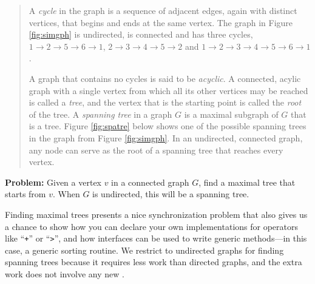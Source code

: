 \begin{quote}
A {\em cycle} in the graph is a sequence of adjacent edges, again with distinct
vertices, that begins and ends at the same vertex.
The graph in Figure \ref{fig:simgph} is undirected, is connected and has three
cycles, 
$1 \rightarrow 2 \rightarrow 5 \rightarrow 6 \rightarrow 1$,
$2 \rightarrow 3 \rightarrow 4 \rightarrow 5 \rightarrow 2$ and
$1 \rightarrow 2 \rightarrow 3 \rightarrow 4 \rightarrow 5 \rightarrow 6 \rightarrow 1$.

A graph that contains no cycles is said to be {\em acyclic}.  A connected,
acylic graph with a single vertex from which all its other vertices may be
reached is called a {\em tree}, and the vertex that is the starting point is
called the {\em root} of the tree. A {\em spanning tree} in a graph $G$ is a
maximal subgraph of $G$ that is a tree. Figure \ref{fig:spatre} below shows one
of the possible spanning trees in the graph from Figure \ref{fig:simgph}.
In an undirected, connected graph, any node can serve as the root of a
spanning tree that reaches every vertex.
\end{quote}

{\bf Problem:} Given a vertex $v$ in a connected graph $G$, find a maximal tree
that starts from $v$.  When $G$ is undirected, this will be a spanning tree.

Finding maximal trees presents a nice synchronization problem that also gives
us a chance to show how you can declare your own implementations for
operators like ``{\tt +}'' or ``{\tt >}'', and how interfaces can be used to
write generic methods---in this case, a generic sorting routine.  We restrict to
undirected graphs for finding spanning trees because it requires less work than
directed graphs, and the extra work does not involve any new \Xten.

